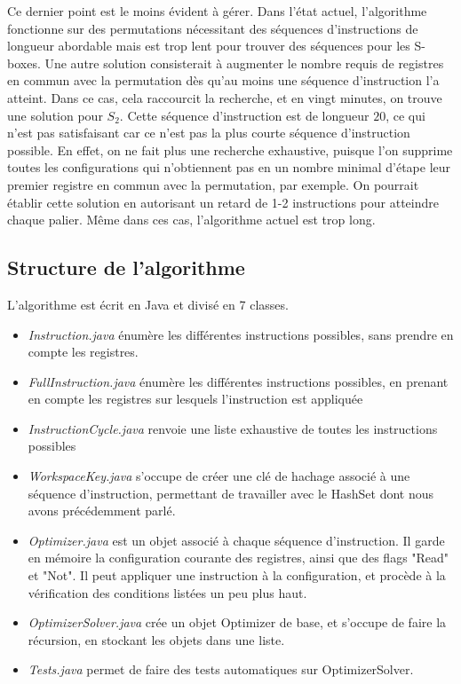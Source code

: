 \documentclass{article}
\begin{document}
Ce dernier point est le moins évident à gérer. Dans l'état actuel, l'algorithme fonctionne sur des permutations nécessitant des séquences d'instructions de longueur abordable mais est trop lent pour trouver des séquences pour les S-boxes. Une autre solution consisterait à augmenter le nombre requis de registres en commun avec la permutation dès qu'au moins une séquence d'instruction l'a atteint. Dans ce cas, cela raccourcit la recherche, et en vingt minutes, on trouve une solution pour $S_2$. Cette séquence d'instruction est de longueur $20$, ce qui n'est pas satisfaisant car ce n'est pas la plus courte séquence d'instruction possible. En effet, on ne fait plus une recherche exhaustive, puisque l'on supprime toutes les configurations qui n'obtiennent pas  en un nombre minimal d'étape leur premier registre en commun avec la permutation, par exemple. On pourrait établir cette solution en autorisant un retard de 1-2 instructions pour atteindre chaque palier. Même dans ces cas, l'algorithme actuel est trop long.

\subsection{Structure de l'algorithme}

L'algorithme est écrit en Java et divisé en 7 classes.
\medbreak
\begin{itemize}
\setlength\itemsep{1em}
\item \textit{Instruction.java} énumère les différentes instructions possibles, sans prendre en compte les registres.
\item \textit{FullInstruction.java} énumère les différentes instructions possibles, en prenant en compte les registres sur lesquels l'instruction est appliquée
\item \textit{InstructionCycle.java} renvoie une liste exhaustive de toutes les instructions possibles
\item \textit{WorkspaceKey.java} s'occupe de créer une clé de hachage associé à une séquence d'instruction, permettant de travailler avec le HashSet dont nous avons précédemment parlé.
\item \textit{Optimizer.java} est un objet associé à chaque séquence d'instruction. Il garde en mémoire la configuration courante des registres, ainsi que des flags "Read" et "Not". Il peut appliquer une instruction à la configuration, et procède à la vérification des conditions listées un peu plus haut.
\item \textit{OptimizerSolver.java} crée un objet Optimizer de base, et s'occupe de faire la récursion, en stockant les objets dans une liste.
\item \textit{Tests.java} permet de faire des tests automatiques sur OptimizerSolver.
 
\end{itemize}
\end{document}
